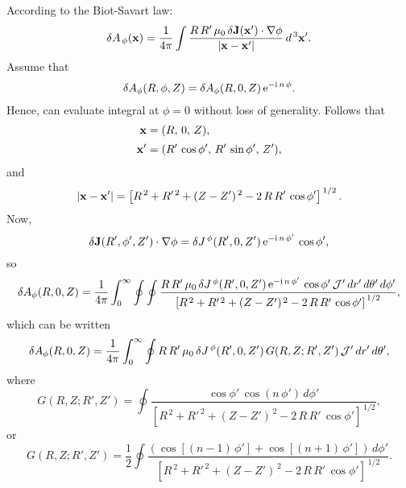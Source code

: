 \documentclass[notitlepage,12pt]{article}
\begin{document}
According to the Biot-Savart law:
\begin{equation}
\delta A_{\,\phi}({\bf x}) = \frac{1}{4\pi}\int \frac{R\,R'\,\mu_0\,\delta {\bf J}({\bf x'})\cdot\nabla\phi}{|{\bf x}-{\bf x}'|}\,d^{\,3}{\bf x}'.
\end{equation}
Assume that
\begin{equation}
\delta A_\phi (R,\phi,Z) = \delta A_\phi(R,0,Z)\,{\rm e}^{-{\rm i}\,n\,\phi}.
\end{equation}
Hence, can evaluate integral at $\phi=0$ without loss of generality. 
Follows that
\begin{align}
{\bf x} &= (R,\,0,\,Z),\\[0.5ex]
{\bf x'}&= (R'\,\cos\phi',\,R'\,\sin\phi',\,Z'),
\end{align}
and
\begin{equation}
|{\bf x}-{\bf x}'| = \left[R^{\,2}+R'^{\,2} +(Z-Z')^{\,2} -2\,R\,R'\,\cos\phi'\right]^{\,1/2}.
\end{equation}
Now,
\begin{equation}
\delta {\bf J}(R',\phi',Z')\cdot\nabla\phi= \delta J^{\,\phi}(R',0,Z')\,{\rm e}^{-{\rm i}\,n\,\phi'}\,\cos\phi',
\end{equation}
so
\begin{equation}
\delta A_\phi(R,0,Z)= \frac{1}{4\pi}\int_0^\infty
\oint\oint \frac{R\,R'\,\mu_0\,\delta J^{\,\phi}(R',0,Z')\,{\rm e}^{-{\rm i}\,n\,\phi'}\,\cos\phi'\,{\cal J}'\,dr'\,d\theta'\,d\phi'}{\left[R^{\,2}+R'^{\,2} +(Z-Z')^{\,2} -2\,R\,R'\,\cos\phi'\right]^{\,1/2}},
\end{equation}
which can be written
\begin{equation}
\delta A_\phi(R,0,Z)= \frac{1}{4\pi}\int_0^\infty
\oint R\,R'\,\mu_0\,\delta J^{\,\phi}(R',0,Z')\,G(R,Z;R',Z')\,{\cal J}'\,dr'\,d\theta',
\end{equation}
where
\begin{equation}
G(R,Z;R',Z') = \oint \frac{\cos \phi'\,\cos(n\,\phi')\,d\phi'}{\left[R^{\,2}+R'^{\,2} +(Z-Z')^{\,2} -2\,R\,R'\,\cos\phi'\right]^{\,1/2}},
\end{equation}
or
\begin{equation}
G(R,Z;R',Z') = \frac{1}{2}\oint \frac{\left(\cos[(n-1)\,\phi']+\cos[(n+1)\,\phi']\right)\,d\phi'}{\left[R^{\,2}+R'^{\,2} +(Z-Z')^{\,2} -2\,R\,R'\,\cos\phi'\right]^{\,1/2}}.
\end{equation}
\end{document}
